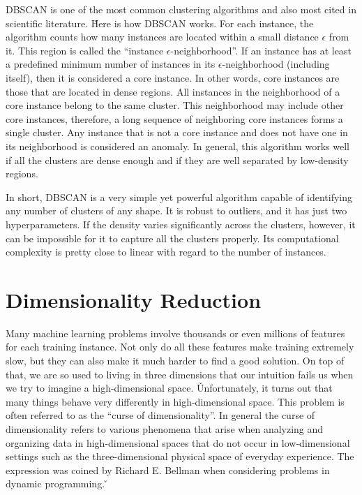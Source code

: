 DBSCAN is one of the most common clustering algorithms and also most cited in scientific literature. \v

Here is how DBSCAN works. For each instance, the algorithm counts how many instances are located within a small 
distance $\epsilon$ from it. This region is called the ``instance $\epsilon$-neighborhood''. If an instance has at
least a predefined minimum number of instances in its $\epsilon$-neighborhood (including itself), then it is 
considered a core instance. In other words, core instances are those that are located in dense regions. All 
instances in the neighborhood of a core instance belong to the same cluster. This neighborhood may include other core
instances, therefore, a long sequence of neighboring core instances forms a single cluster. Any instance that is not
a core instance and does not have one in its neighborhood is considered an anomaly. In general, this algorithm works 
well if all the clusters are dense enough and if they are well separated by low-density regions.


In short, DBSCAN is a very simple yet powerful algorithm capable of identifying any number of clusters of any shape. 
It is robust to outliers, and it has just two hyperparameters. If the density varies significantly across the 
clusters, however, it can be impossible for it to capture all the clusters properly. Its computational complexity 
is pretty close to linear with regard to the number of instances.

\section{Dimensionality Reduction}

Many machine learning problems involve thousands or even millions of features for each training instance. Not only do
all these features make training extremely slow, but they can also make it much harder to find a good solution. On 
top of that, we are so used to living in three dimensions that our intuition fails us when we try to imagine a 
high-dimensional space. \v

Unfortunately, it turns out that many things behave very differently in high-dimensional space. This problem is often
referred to as the ``curse of dimensionality''. In general the curse of dimensionality refers to various phenomena
that arise when analyzing and organizing data in high-dimensional spaces that do not occur in low-dimensional 
settings such as the three-dimensional physical space of everyday experience. The expression was coined by Richard E.
Bellman when considering problems in dynamic programming. \v

